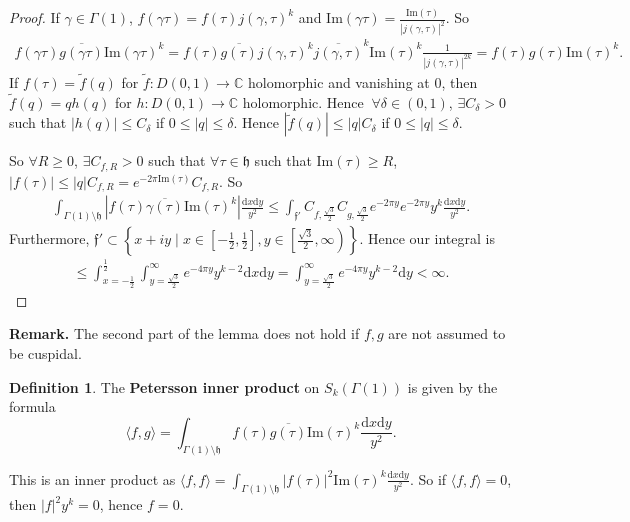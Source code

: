 \documentclass{article}
\theoremstyle{definition}
\newtheorem{defn}{Definition}[section]
\begin{document}
\begin{proof}
    If $\gamma \in \Gamma(1)$, $f(\gamma \tau) = f(\tau)j(\gamma,\tau)^{k}$ and $\text{Im}(\gamma \tau) = \frac{\text{Im}(\tau)}{|j(\gamma,\tau)|^2}$. So 
    \begin{align*}
        f(\gamma \tau)\overline{g(\gamma \tau)}\text{Im}(\gamma \tau)^k = f(\tau)\overline{g(\tau)}j(\gamma,\tau)^k \overline{j(\gamma,\tau)}^k \text{Im}(\tau)^k \frac{1}{|j(\gamma,\tau)|^{2k}} = f(\tau)g(\tau)\text{Im}(\tau)^k.
    \end{align*}
    If $f(\tau) = \tilde{f}(q)$ for $\tilde{f}: D(0,1) \to \mathbb{C}$ holomorphic and vanishing at 0, then $\tilde{f}(q) = q h(q)$ for $h: D(0,1) \to \mathbb{C}$ holomorphic. Hence $~\forall \delta \in (0,1)$, $\exists C_{\delta} > 0$ such that $|h(q)| \le C_\delta$ if $0 \le |q| \le \delta$. Hence $|\tilde{f}(q)|\le |q|C_\delta$ if $0\le |q|\le \delta$. 
    \vspace{1mm}
     
    So $\forall R\ge 0$, $\exists C_{f,R} > 0$ such that $\forall \tau \in \mathfrak{h}$ such that $\text{Im}(\tau)\ge R$, $|f(\tau)|\le |q|C_{f,R} = e^{-2\pi \text{Im}(\tau)}C_{f,R}$. So
    \begin{align*}
        \int_{\Gamma(1)\setminus \mathfrak{h}}^{} \left|f(\tau)\overline{\gamma(\tau)}\text{Im}(\tau)^k \right| \frac{\mathrm{d}x\mathrm{d}y}{y^2} \le \int_{\mathfrak{f}'}^{} C_{f,\frac{\sqrt{3}}{2}} C_{g,\frac{\sqrt{3}}{2}} e^{-2\pi y}e^{-2\pi y} y^k \frac{\mathrm{d}x \mathrm{d}y}{y^2}.
    \end{align*}
    Furthermore, $\mathfrak{f}' \subset \left\{x+iy \mid x \in \left[-\frac{1}{2}, \frac{1}{2}\right], y \in \left[\frac{\sqrt{3}}{2},\infty \right)\right\}$. Hence our integral is 
    \begin{align*}
        \le \int_{x=-\frac{1}{2}}^{\frac{1}{2}} \int_{y=\frac{\sqrt{3}}{2}}^{\infty} e^{-4\pi y} y^{k-2} \mathrm{d}x \mathrm{d}y = \int_{y = \frac{\sqrt{3}}{2}}^{\infty} e^{-4\pi y} y^{k-2} \mathrm{d}y < \infty.
    \end{align*}
\end{proof}
\textbf{Remark.} The second part of the lemma does not hold if $f,g$ are not assumed to be cuspidal.

\begin{defn}
    The \textbf{Petersson inner product} on $S_k(\Gamma(1))$ is given by the formula $$\langle f,g \rangle = \int_{\Gamma(1)\setminus \mathfrak{h}}^{} f(\tau)\overline{g(\tau)}\text{Im}(\tau)^k \frac{\mathrm{d}x\mathrm{d}y}{y^2}.$$
\end{defn}
This is an inner product as $\langle f,f \rangle = \int_{\Gamma(1)\setminus \mathfrak{h}}^{} |f(\tau)|^2 \text{Im}(\tau)^{k} \frac{\mathrm{d}x\mathrm{d}y}{y^2}$. So if $\langle f,f \rangle = 0$, then $|f|^2 y^k = 0$, hence $f = 0$.
\end{document}
